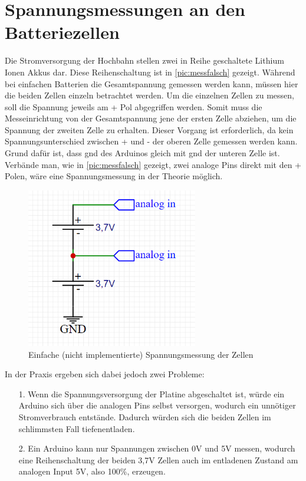 \section{Spannungsmessungen an den Batteriezellen}
\label{sec:mess}
Die Stromversorgung der Hochbahn stellen zwei in Reihe geschaltete Lithium Ionen Akkus dar. Diese Reihenschaltung ist in \autoref{pic:messfalsch} gezeigt. Während bei einfachen Batterien die Gesamtspannung gemessen werden kann, müssen hier die beiden Zellen einzeln betrachtet werden.
Um die einzelnen Zellen zu messen, soll die Spannung jeweils am + Pol abgegriffen werden. Somit muss die Messeinrichtung von der Gesamtspannung jene der ersten Zelle abziehen, um die Spannung der zweiten Zelle zu erhalten. Dieser Vorgang ist erforderlich, da kein Spannungsunterschied zwischen + und - der oberen Zelle gemessen werden kann. Grund dafür ist, dass \gls{gnd} des Arduinos gleich mit \gls{gnd} der unteren Zelle ist.
Verbände man, wie in \autoref{pic:messfalsch} gezeigt, zwei analoge Pins direkt mit den + Polen, wäre eine Spannungsmessung in der Theorie möglich.

\begin{figure}[h]
	\begin{center}
		\includegraphics[width=7.5cm]{wrongMeasure.PNG}
		\caption{\label{pic:messfalsch} Einfache (nicht implementierte) Spannungsmessung der Zellen}
	\end{center}
\end{figure}

In der Praxis ergeben sich dabei jedoch zwei Probleme:

\begin{center}
	\begin{itemize}
		\item [1.] Wenn die Spannungsversorgung der Platine abgeschaltet ist, würde ein Arduino sich über die analogen Pins selbst versorgen, wodurch ein unnötiger Stromverbrauch entstände. Dadurch würden sich die beiden Zellen im schlimmsten Fall tiefenentladen.
		\item [2.] Ein Arduino kann nur Spannungen zwischen 0V und 5V messen, wodurch eine Reihenschaltung der beiden 3,7V Zellen auch im entladenen Zustand am analogen Input 5V, also 100\%, erzeugen. 
	\end{itemize}
\end{center}

